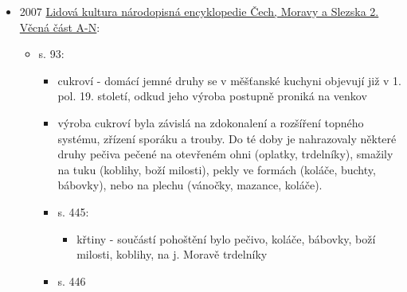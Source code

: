 \begin{itemize}
  \begin{itemize}
  \tightlist
  \item
    s. 22-23, \emph{Každodennost v životě slováckého lidu XXI.
    (Doplňkové pracovní aktivity)}, 
  \item
    těsto podobný jako na vdolečky, jen trochu tužší
  \item
    těsto se válelo do úzkýho pruhu, nebo širokýho plátu
  \item
    zmínka o náplních z tvarohu, máku, ořechů. ty náplně se zaplňovaly
    do plátů (což je další druh trdélníku, podobnej německýmu
    Baumstriezel)
  \item
    taky zmínka, že na Podluží se jako trdelník označujou i šmetrdole
  \item
    představu, že trdelník pochází z Maďarska označuje za mylnou, i když
    nezpochybňuje, že i tam je populární
  \item
    tradici v současnosti obnovily ženy ze Skalice a prodávají se běžně
    na jarmarcích
  \end{itemize}
\item
  2007
  \href{https://www.digitalniknihovna.cz/mzk/uuid/uuid:e1812610-0867-11e6-a5b6-005056827e52}{Lidová
  kultura národopisná encyklopedie Čech, Moravy a Slezska 2. Věcná část
  A-N}:

  \begin{itemize}
  \tightlist
  \item
    s. 93:

    \begin{itemize}
    \tightlist
    \item
      cukroví - domácí jemné druhy se v měšťanské kuchyni objevují již v
      1. pol. 19. století, odkud jeho výroba postupně proniká na venkov
    \item
      výroba cukroví byla závislá na zdokonalení a rozšíření topného
      systému, zřízení sporáku a trouby. Do té doby je nahrazovaly
      některé druhy pečiva pečené na otevřeném ohni (oplatky,
      trdelníky), smažily na tuku (koblihy, boží milosti), pekly ve
      formách (koláče, buchty, bábovky), nebo na plechu (vánočky,
      mazance, koláče).
    \item
      s. 445:

      \begin{itemize}
      \tightlist
      \item
        křtiny - součástí pohoštění bylo pečivo, koláče, bábovky, boží
        milosti, koblihy, na j. Moravě trdelníky
      \end{itemize}
    \item
      s. 446


\end{itemize}
\end{itemize}
\end{itemize}
